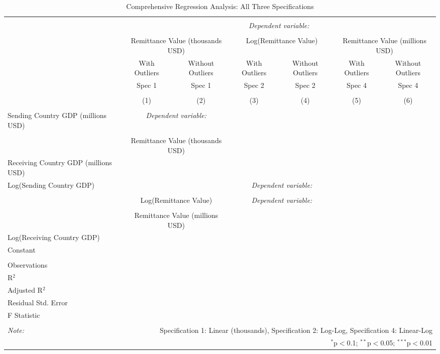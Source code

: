 
\begin{table}[!htbp] \centering
  \caption{Comprehensive Regression Analysis: All Three Specifications}
  \label{}
\begin{tabular}{@{\extracolsep{5pt}}lcccccc}
\\[-1.8ex]\hline
\hline \\[-1.8ex]
 & \multicolumn{6}{c}{\textit{Dependent variable:}} \\
\cline{2-7}
\\[-1.8ex] & \multicolumn{2}{c}{Remittance Value (thousands USD)} & \multicolumn{2}{c}{Log(Remittance Value)} & \multicolumn{2}{c}{Remittance Value (millions USD)} \\
 & With Outliers & Without Outliers & With Outliers & Without Outliers & With Outliers & Without Outliers \\
 & Spec 1 & Spec 1 & Spec 2 & Spec 2 & Spec 4 & Spec 4 \\
\\[-1.8ex] & (1) & (2) & (3) & (4) & (5) & (6)\\
\hline \\[-1.8ex]
 Sending Country GDP (millions USD) & \multicolumn{2}{c}{\textit{Dependent variable:}} \\ 
\cline{2-3} 
\\[-1.8ex] & \multicolumn{2}{c}{Remittance Value (thousands USD)} & & & & \\
 Receiving Country GDP (millions USD) &  &  & & & & \\
 Log(Sending Country GDP) & & & \multicolumn{2}{c}{\textit{Dependent variable:}} \\ 
\cline{2-3} 
\\[-1.8ex] & \multicolumn{2}{c}{Log(Remittance Value)} & \multicolumn{2}{c}{\textit{Dependent variable:}} \\ 
\cline{2-3} 
\\[-1.8ex] & \multicolumn{2}{c}{Remittance Value (millions USD)} \\
 Log(Receiving Country GDP) & & &  &  &  &  \\
 Constant &  &  &  &  &  &  \\
 \hline \\[-1.8ex]
Observations &  &  &  &  &  &  \\
R$^{2}$ &  &  &  &  &  &  \\
Adjusted R$^{2}$ &  &  &  &  &  &  \\
Residual Std. Error &  &  &  &  &  &  \\
F Statistic &  &  &  &  &  &  \\
\hline
\hline \\[-1.8ex]
\textit{Note:}  & \multicolumn{6}{r}{Specification 1: Linear (thousands), Specification 2: Log-Log, Specification 4: Linear-Log} \\
 & \multicolumn{6}{r}{$^{*}$p$<$0.1; $^{**}$p$<$0.05; $^{***}$p$<$0.01} \\
\end{tabular}
\end{table}

